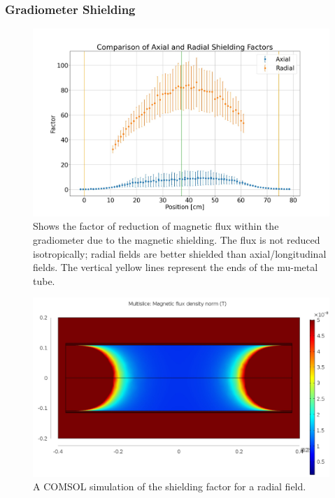 \documentclass{TheMartianReport}
\begin{document}
\subsubsection{Gradiometer Shielding}
\begin{figure}[h]
	\centering
	\includegraphics[scale=0.3]{shielding_factor}
	\caption{Shows the factor of reduction of magnetic flux within the gradiometer due to the magnetic shielding. The flux is not reduced isotropically; radial fields are better shielded than axial/longitudinal fields. The vertical yellow lines represent the ends of the mu-metal tube.}
	\label{fig:ShieldingFact}
\end{figure}

\begin{figure}[h]
	\centering
	\includegraphics[scale=0.35]{radial_sim}
	\caption{A COMSOL simulation of the shielding factor for a radial field.}
	\label{fig:RadialSim}
\end{figure}
\end{document}
